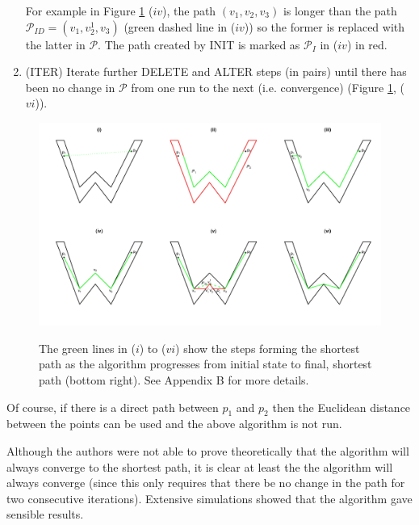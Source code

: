 \documentclass[useAMS, referee]{biom}
\begin{document}
\begin{enumerate}
For example in Figure \ref{wdia} ($iv$), the path $(v_1, v_2, v_3)$ is longer than the path $\mathcal{P}_{ID}=(v_1, v^1_2, v_3)$ (green dashed line in ($iv$)) so the former is replaced with the latter in $\mathcal{P}$. The path created by INIT is marked as $\mathcal{P}_{I}$ in  ($iv$) in red.

\item (ITER) Iterate further DELETE and ALTER steps (in pairs) until there has been no change in $\mathcal{P}$ from one run to the next (i.e. convergence) (Figure \ref{wdia}, ($vi$)).
\end{enumerate}

\begin{figure}
\includegraphics[angle=90, height=\textheight,trim=0in 0.5in 0in 0.25in]{figs/wdia.pdf} \\
\caption{The green lines in ($i$) to ($vi$) show the steps forming the shortest path as the algorithm progresses from initial state to final, shortest path (bottom right). See Appendix B for more details.}
\label{wdia}
\end{figure}

Of course, if there is a direct path between $p_1$ and $p_2$ then the Euclidean distance between the points can be used and the above algorithm is not run.

Although the authors were not able to prove theoretically that the algorithm will always converge to the shortest path, it is clear at least the the algorithm will always converge (since this only requires that there be no change in the path for two consecutive iterations). Extensive simulations showed that the algorithm gave sensible results.
\end{document}

